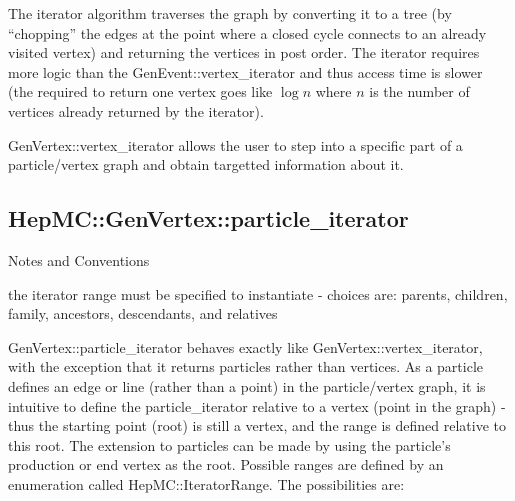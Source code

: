 \documentclass[11pt,letterpaper]{article}
\begin{document}
The iterator algorithm traverses the graph by converting it to a tree
(by ``chopping'' the edges at the point where a closed cycle connects
to an already visited vertex) and returning the vertices in post
order. The iterator requires more logic than the
GenEvent::vertex\_iterator and thus access time is slower (the
required to return one vertex goes like $\log n$ where $n$ is the
number of vertices already returned by the iterator).

GenVertex::vertex\_iterator allows the user to step into a specific part
of a particle/vertex graph and obtain targetted information about it. 

%
%

\subsection{HepMC::GenVertex::particle\_iterator}
\begin{myitemize}{Notes and Conventions}
  \item the iterator range must be specified to instantiate -
    choices are: parents, children, family, ancestors, descendants,
    and relatives 
\end{myitemize}

GenVertex::particle\_iterator behaves exactly like
GenVertex::vertex\_iterator, with the exception that it returns particles
rather than vertices.  As a particle defines an edge or line (rather
than a point) in the particle/vertex graph, it is intuitive to define
the particle\_iterator relative to a vertex (point in the graph) - thus
the starting point (root) is still a vertex, and the range is defined
relative to this root.  The extension to particles can be made by
using the particle's production or end vertex as the root.  Possible
ranges are defined by an enumeration called HepMC::IteratorRange.
The possibilities are:
\begin{itemize}\setlength{\itemsep}{0pt}
\end{itemize}
\end{document}
